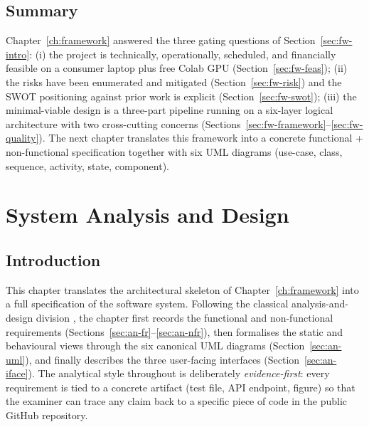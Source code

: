 \documentclass[11pt,a4paper,oneside]{report}
\begin{document}
\section{Summary}
\label{sec:fw-summary}

Chapter~\ref{ch:framework} answered the three gating
questions of Section~\ref{sec:fw-intro}: (i) the project is
technically, operationally, scheduled, and financially
feasible on a consumer laptop plus free Colab GPU
(Section~\ref{sec:fw-feas}); (ii) the risks have been
enumerated and mitigated (Section~\ref{sec:fw-risk}) and the
SWOT positioning against prior work is explicit
(Section~\ref{sec:fw-swot}); (iii) the minimal-viable design
is a three-part pipeline running on a six-layer logical
architecture with two cross-cutting concerns
(Sections~\ref{sec:fw-framework}--\ref{sec:fw-quality}). The
next chapter translates this framework into a concrete
functional + non-functional specification together with six
UML diagrams (use-case, class, sequence, activity, state,
component).


\chapter{System Analysis and Design}
\label{ch:analysis}

\section{Introduction}
\label{sec:an-intro}

This chapter translates the architectural skeleton of
Chapter~\ref{ch:framework} into a full specification of
the software system. Following the classical analysis-and-
design division \citep{bass2012softwarearch}, the chapter
first records the functional and non-functional
requirements (Sections~\ref{sec:an-fr}--\ref{sec:an-nfr}),
then formalises the static and behavioural views through
the six canonical UML diagrams \citep{fowler2004uml}
(Section~\ref{sec:an-uml}), and finally describes the three
user-facing interfaces (Section~\ref{sec:an-iface}). The
analytical style throughout is deliberately
\emph{evidence-first}: every requirement is tied to a
concrete artifact (test file, API endpoint, figure) so that
the examiner can trace any claim back to a specific piece
of code in the public GitHub repository.
\end{document}
